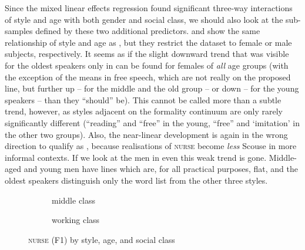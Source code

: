 Since the mixed linear effects regression found significant three-way interactions of style and age with both gender and social class, we should also look at the sub-samples defined by these two additional predictors.
 and  show the same relationship of style and age as , but they restrict the dataset to female or male subjects, respectively.
It seems as if the slight downward trend that was visible for the oldest speakers only in  can be found for females of \emph{all} age groups (with the exception of the means in free speech, which are not really on the proposed line, but further up -- for the middle and the old group -- or down -- for the young speakers -- than they ``should'' be).
This cannot be called more than a subtle trend, however, as styles adjacent on the formality continuum are only rarely significantly different (``reading'' and ``free'' in the young, ``free'' and `imitation' in the other two groups).
Also, the near-linear development is again in the wrong direction to qualify as , because realisations of \textsc{nurse} become \emph{less} Scouse in more informal contexts.
If we look at the men in  even this weak trend is gone.
Middle-aged and young men have lines which are, for all practical purposes, flat, and the oldest speakers distinguish only the word list from the other three styles.

\begin{figure}
	
	\begin{subfigure}{.49\textwidth}
		
			\resizebox{\linewidth}{!}{} 
		\caption{middle class}
		\label{fig.line.f1.nurse.mc}
	\end{subfigure}
	\begin{subfigure}{.49\textwidth}
		
			\resizebox{\linewidth}{!}{} 
		\caption{working class}
		\label{fig.line.f1.nurse.wc}
	\end{subfigure}
	\caption{\textsc{nurse} (F1) by style, age, and social class}
\end{figure}

